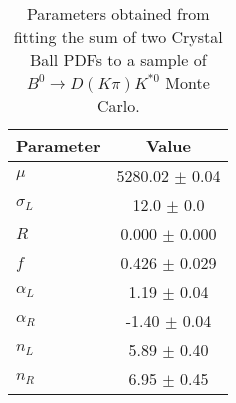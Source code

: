 \begin{table}[h]
  \centering
  \begin{tabular}{lc}
      \toprule
      Parameter & Value \\
      \midrule
      $\mu$ & 5280.02 $\pm$ 0.04 \\
      $\sigma_L$ & 12.0 $\pm$ 0.0 \\
      $R$ & 0.000 $\pm$ 0.000 \\
      $f$ & 0.426 $\pm$ 0.029 \\
      $\alpha_L$ & 1.19 $\pm$ 0.04 \\
      $\alpha_R$ & -1.40 $\pm$ 0.04 \\
      $n_L$ & 5.89 $\pm$ 0.40 \\
      $n_R$ & 6.95 $\pm$ 0.45 \\
  \bottomrule
  \end{tabular}
  \caption{Parameters obtained from fitting the sum of two Crystal Ball PDFs to a sample of $B^0 \to D(K\pi)K^{*0}$ Monte Carlo.}
\label{tab:signal_Kpi_MC_params}
\end{table}
